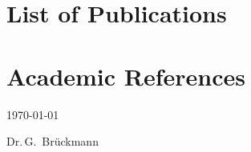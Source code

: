 \documentclass[12pt,a4paper]{moderncv}
\begin{document}
\newpage
\makecvtitle


\newpage
\section{List of Publications}














\section{Academic References}





\emptysection{}\closesection{}
\vfill %
\begin{minipage}[b]{0.4\textwidth}
  \textcolor{color2}{\today}
\end{minipage}%
\hfill
\begin{minipage}[b]{0.4\textwidth}
     \raggedleft
  \textcolor{color2}{Dr.\,G.~Brückmann}
 \end{minipage}
\end{document}
